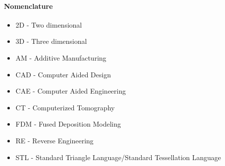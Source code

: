 \paragraph{Nomenclature}
\begin{itemize}
\item 2D - Two dimensional
\item 3D - Three dimensional
\item AM - Additive Manufacturing
\item CAD - Computer Aided Design
\item CAE - Computer Aided Engineering
\item CT - Computerized Tomography
\item FDM - Fused Deposition Modeling
\item RE - Reverse Engineering
\item STL - Standard Triangle Language/Standard Tessellation Language
\end{itemize}
\pagebreak